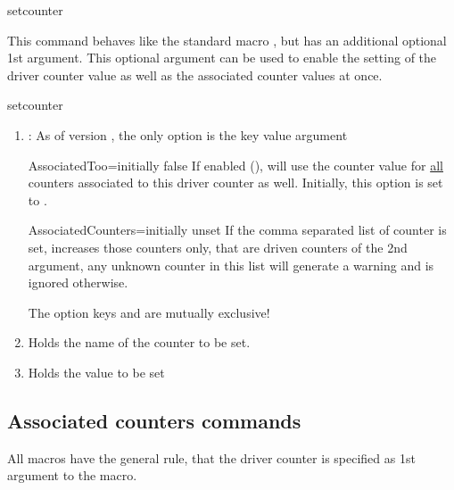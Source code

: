 \documentclass[12pt,paper=a4]{article}
\def\packageversion{\assoccntpackageversion}%
\begin{document}
\begin{docCommand}{setcounter}{}

This command behaves like the standard macro , but has an additional optional 1st argument. This optional argument can be used to enable the setting of the driver counter value as well as the associated counter values at once.

\begin{docCommandArgs}{setcounter}%


\begin{enumerate}[label={\textcolor{blue}{\#\arabic*}}]
  \item {}: As of version \packageversion, the only option is the key value argument

    \begin{docKey}{AssociatedToo}{=}{initially false}
      If enabled (),  will use the counter value for \underline{all} counters associated to this driver counter as well. Initially, this option is set to . 
    \end{docKey}

    \begin{docKey}{AssociatedCounters}{=}{initially unset}
      If the comma separated list of counter is set,  increases those counters only, that are driven counters of the 2nd argument, any unknown counter in this list will generate a warning and is ignored otherwise. 
    \end{docKey}
    The option keys  and  are mutually exclusive!

  \item {} 

    Holds the name of the counter to be set. 
\item {}
  Holds the value to be set 
\end{enumerate}
\end{docCommandArgs}

\end{docCommand}%


\subsection{Associated counters commands}

All macros have the general rule, that the driver counter is specified as 1st argument to the macro.
\end{document}
